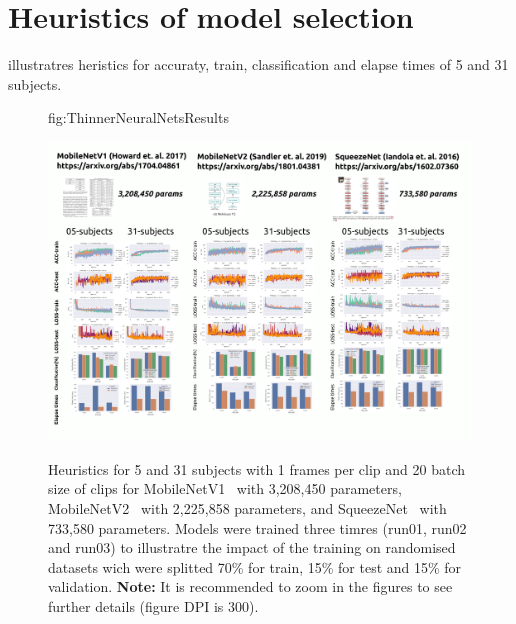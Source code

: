 \documentclass[mlabstract,twocolumn]{jmlr}
\begin{document}
\begin{figure}[htbp]
\end{figure}

\section{Heuristics of model selection} \label{apd:heuristics}
 illustratres heristics for accuraty, train, classification and elapse times of 5 and 31 subjects.
\begin{figure}[ht]
\floatconts
  {fig:ThinnerNeuralNetsResults}
  {\caption{
    Heuristics for 5 and 31 subjects with 1 frames per clip and 20 batch size of clips for
    MobileNetV1~\citep{2017-howared_CoRR_MobileNetV1} with 3,208,450 parameters, MobileNetV2~\citep{Sandler_2018_CVPR_MobileNetV2} with 2,225,858 parameters, and SqueezeNet~\citep{iandola2017squeezenet} with 733,580 parameters.
    Models were trained three timres (run01, run02 and run03) to illustratre the impact of the training on randomised datasets wich were splitted 70\% for train, 15\% for test and 15\% for validation.  
    \textbf{Note:} It is recommended to zoom in the figures to see further details (figure DPI is 300).
          }
  }
  {\includegraphics[width=\textwidth]{../figures/comparing-NETS-for-USviewclassification/versions/drawing-v02}}%
\end{figure}
\end{document}
